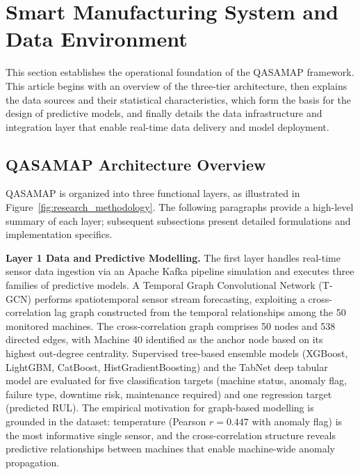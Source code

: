 \section{Smart Manufacturing System and Data Environment}

This section establishes the operational foundation of the QASAMAP framework. This article begins with an overview of the three-tier architecture, then explains the data sources and their statistical characteristics, which form the basis for the design of predictive models, and finally details the data infrastructure and integration layer that enable real-time data delivery and model deployment.

\subsection{QASAMAP Architecture Overview}

QASAMAP is organized into three functional layers, as illustrated in Figure~\ref{fig:research_methodology}. The following paragraphs provide a high-level summary of each layer; subsequent subsections present detailed formulations and implementation specifics.

\textbf{Layer 1 Data and Predictive Modelling.} The first layer handles real-time sensor data ingestion via an Apache Kafka pipeline simulation and executes three families of predictive models. A Temporal Graph Convolutional Network (T-GCN) performs spatiotemporal sensor stream forecasting, exploiting a cross-correlation lag graph constructed from the temporal relationships among the 50 monitored machines. The cross-correlation graph comprises 50 nodes and 538 directed edges, with Machine 40 identified as the anchor node based on its highest out-degree centrality. Supervised tree-based ensemble models (XGBoost, LightGBM, CatBoost, HistGradientBoosting) and the TabNet deep tabular model are evaluated for five classification targets (machine status, anomaly flag, failure type, downtime risk, maintenance required) and one regression target (predicted RUL). The empirical motivation for graph-based modelling is grounded in the dataset: temperature (Pearson $r = 0.447$ with anomaly flag) is the most informative single sensor, and the cross-correlation structure reveals predictive relationships between machines that enable machine-wide anomaly propagation.

